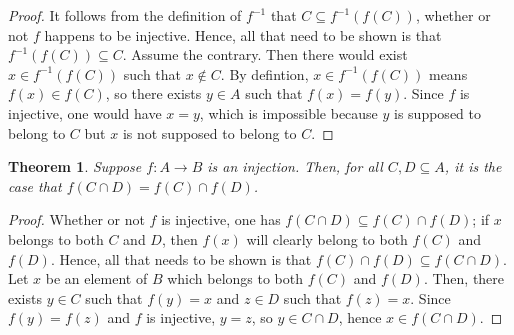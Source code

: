 \documentclass[12pt]{article}
\newtheorem{theorem}{Theorem}
\begin{document}
\begin{proof}
It follows from the definition of $f^{-1}$ that $C \subseteq f^{-1}  
(f (C))$, whether or not $f$ happens to be injective.  Hence, all that
need to be shown is that $f^{-1} (f (C)) \subseteq C$.  Assume the
contrary.  Then there would exist $x \in f^{-1} (f (C))$ such that
$x \notin C$.  By defintion, $x \in f^{-1} (f (C))$ means $f(x) \in 
f(C)$, so there exists $y \in A$ such that $f(x) = f(y)$.  Since $f$
is injective, one would have $x = y$, which is impossible because
$y$ is supposed to belong to $C$ but $x$ is not supposed to belong to $C$.
\end{proof}

\begin{theorem}
Suppose $f\colon A\to B$ is an injection.  Then, for all $C, D\subseteq A$, 
it is the case that $f(C \cap D) = f(C) \cap f(D)$.
\end{theorem}

\begin{proof}
Whether or not $f$ is injective, one has $f(C \cap D) \subseteq f(C) 
\cap f(D)$; if $x$ belongs to both $C$ and $D$, then $f(x)$ will clearly
belong to both $f(C)$ and $f(D)$.  Hence, all that needs to be shown is
that $f(C) \cap f(D) \subseteq f(C \cap D)$.  Let $x$ be an element of
$B$ which belongs to both $f(C)$ and $f(D)$.  Then, there exists $y \in C$
such that $f(y) = x$ and $z \in D$ such that $f(z) = x$.  Since $f(y) = 
f(z)$ and $f$ is injective, $y = z$, so $y \in C \cap D$, hence $x \in
f(C \cap D)$.
\end{proof}
\end{document}
